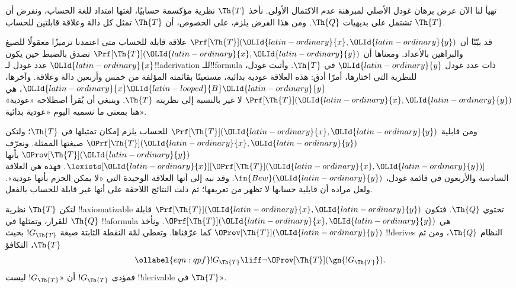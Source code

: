 \documentclass[../../../include/open-logic-section]{subfiles}
\begin{document}


تهيأ لنا الآن عرض برهان غودل الأصلي لمبرهنة عدم الاكتمال الأولى.
نأخذ $\Th{T}$ نظرية مؤكسمة حسابيًا، لغتها امتداد للغة الحساب،
ونفرض أن $\Th{T}$ تشتمل على بديهيات $\Th{Q}$. ومن هذا الفرض
يلزم، على الخصوص، أن $\Th{T}$ تمثل كل دالة وعلاقة قابلتين للحساب.

قد بيّنّا أن $\Prf[\Th{T}](\OLId{latin-ordinary}{x},\OLId{latin-ordinary}{y})$ علاقة قابلة للحساب متى اعتمدنا
ترميزًا معقولًا للصيغ والبراهين بالأعداد. ومعناها أن
$\Prf[\Th{T}](\OLId{latin-ordinary}{x},\OLId{latin-ordinary}{y})$ تصدق بالضبط حين يكون $\OLId{latin-ordinary}{x}$ عدد غودل
لـ!!a{derivation} للـ!!{formula} ذات عدد غودل $\OLId{latin-ordinary}{y}$ في
$\Th{T}$. وأثبت غودل، للنظرية التي اختارها، أمرًا أدق: هذه العلاقة
عودية بدائية، مستعينًا بقائمته المؤلفة من خمس وأربعين دالة وعلاقة.
وآخرها، $\OLId{latin-ordinary}{x} \OLId{latin-looped}{B} \OLId{latin-ordinary}{y}$، هي $\Prf[\Th{T}](\OLId{latin-ordinary}{x},\OLId{latin-ordinary}{y})$ لا غير بالنسبة إلى
نظريته $\Th{T}$. وينبغي أن يُقرأ اصطلاحه «عودية» هنا بمعنى ما
نسميه اليوم «عودية بدائية».

ومن قابلية $\Prf[\Th{T}](\OLId{latin-ordinary}{x},\OLId{latin-ordinary}{y})$ للحساب يلزم إمكان تمثيلها في
$\Th{T}$؛ ولتكن $\OPrf[\Th{T}](\OLId{latin-ordinary}{x},\OLId{latin-ordinary}{y})$ صيغتها الممثلة.
ونعرّف $\OProv[\Th{T}](\OLId{latin-ordinary}{y})$ بأنها
$\lexists[\OLId{latin-ordinary}{x}][\OPrf[\Th{T}](\OLId{latin-ordinary}{x},\OLId{latin-ordinary}{y})]$. فهذه هي العلاقة السادسة
والأربعون في قائمة غودل، $\fn{Bew}(\OLId{latin-ordinary}{y})$. وقد نبه إلى أنها العلاقة
الوحيدة التي «لا يمكن الجزم بأنها عودية». ولعل مراده أن قابلية
حسابها لا تظهر من تعريفها؛ ثم دلت النتائج اللاحقة على أنها
غير قابلة للحساب بالفعل.

لتكن $\Th{T}$ نظرية !!{axiomatizable} تحتوي $\Th{Q}$.
فتكون $\Prf[\Th{T}](\OLId{latin-ordinary}{x},\OLId{latin-ordinary}{y})$ قابلة للقرار، وتمثلها في $\Th{Q}$
!!a{formula} هي $\OPrf[\Th{T}](\OLId{latin-ordinary}{x},\OLId{latin-ordinary}{y})$. ونأخذ
$\OProv[\Th{T}](\OLId{latin-ordinary}{y})$ كما عرّفناها. وتعطي لمّة النقطة الثابتة صيغة
$!G_\Th{T}$ بحيث !!{derive}s النظام $\Th{Q}$، ومن ثم $\Th{T}$،
التكافؤ
\begin{equation}
\ollabel{eqn:qpf}
!G_\Th{T} \liff \lnot \OProv[\Th{T}](\gn{!G_\Th{T}}).
\end{equation}
فمؤدى $!G_\Th{T}$ أن «$!G_\Th{T}$ ليست !!{derivable} في
$\Th{T}$».
\end{document}
